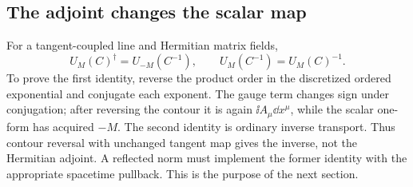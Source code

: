 \subsection{The adjoint changes the scalar map}

For a tangent-coupled line and Hermitian matrix fields,
\begin{equation}\label{eq:dagger}
 U_M(C)^\dagger=U_{-M}(C^{-1}),\qquad
 U_M(C^{-1})=U_M(C)^{-1}.
\end{equation}
To prove the first identity, reverse the product order in the discretized
ordered exponential and conjugate each exponent. The gauge term changes
sign under conjugation; after reversing the contour it is again
$\ii A_\mu\dd x^\mu$, while the scalar one-form has acquired $-M$.
The second identity is ordinary inverse transport. Thus contour
reversal with unchanged tangent map gives the inverse, not the
Hermitian adjoint. A reflected norm must implement the former identity
with the appropriate spacetime pullback. This is the purpose of the
next section.
